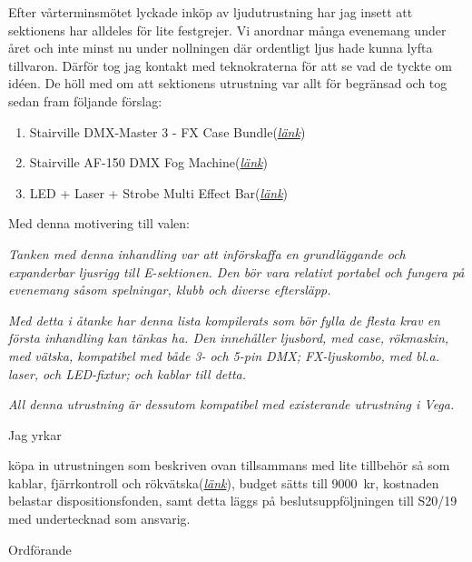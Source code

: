 \documentclass[10pt]{article}
\begin{document}
 	Efter vårterminsmötet lyckade inköp av ljudutrustning har jag insett att sektionens har alldeles för lite festgrejer. Vi anordnar många evenemang under året och inte minst nu under nollningen där ordentligt ljus hade kunna lyfta tillvaron. Därför tog jag kontakt med teknokraterna för att se vad de tyckte om idéen. De höll med om att sektionens utrustning var allt för begränsad och tog sedan fram följande förslag:


\begin{enumerate}
 \item Stairville DMX-Master 3 - FX Case Bundle(\href{https://www.thomann.de/se/stairville_dmx_master_3_fx_case_bundle.htm}{\textit{länk}})

 \item Stairville AF-150 DMX Fog Machine(\href{https://www.thomann.de/se/stairville_af_150_dmx_fog_machine.htm}{\textit{länk}})
 \item LED + Laser + Strobe Multi Effect Bar(\href{https://www.thomann.de/se/stairville_dmx_master_3_fx_case_bundle.htm}{\textit{länk}})
\end{enumerate}   

                          

Med denna motivering till valen: 

\textit{Tanken med denna inhandling var att införskaffa en grundläggande och expanderbar ljusrigg till E-sektionen. Den bör vara relativt portabel och fungera på evenemang såsom spelningar, klubb och diverse eftersläpp.} 

\textit{Med detta i åtanke har denna lista kompilerats som bör fylla de flesta krav en första inhandling kan tänkas ha. Den innehåller ljusbord, med case, rökmaskin, med vätska, kompatibel med både 3- och 5-pin DMX; FX-ljuskombo, med bl.a. laser, och LED-fixtur; och kablar till detta.}

\textit{All denna utrustning är dessutom kompatibel med existerande utrustning i Vega.}

Jag yrkar



    \begin{attsatser}
        \att köpa in utrustningen som beskriven ovan tillsammans med lite tillbehör så som kablar, fjärrkontroll och rökvätska(\href{https://www.thomann.de/se/wishlist_4u_05097b248996.html}{\textit{länk}}),
        \att budget sätts till \SI{9000}{kr},
        \att kostnaden belastar dispositionsfonden, samt
        \att detta läggs på beslutsuppföljningen till S20/19 med undertecknad som ansvarig. 
    \end{attsatser}

    \begin{signatures}{1}
    \textit{\ist}
    \signature{Edvard Carlsson}{Ordförande}
    \end{signatures}





   



    
\end{document}
